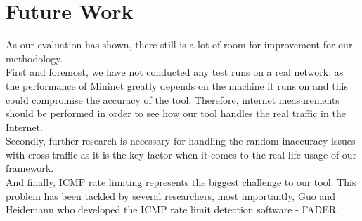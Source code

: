 \section{Future Work}
As our evaluation has shown, there still is a lot of room for improvement for our methodology.\\
First and foremost, we have not conducted any test runs on a real network, as the performance of Mininet greatly depends on the machine it runs on and this could compromise the accuracy of the tool. Therefore, internet measurements should be performed in order to see how our tool handles the real traffic in the Internet.\\
Secondly, further research is necessary for handling the random inaccuracy issues with cross-traffic as it is the key factor when it comes to the real-life usage of our framework.\\
And finally, ICMP rate limiting represents the biggest challenge to our tool. This problem has been tackled by several researchers, most importantly, Guo and Heidemann who developed the ICMP rate limit detection software - FADER\cite{fader2017}.

